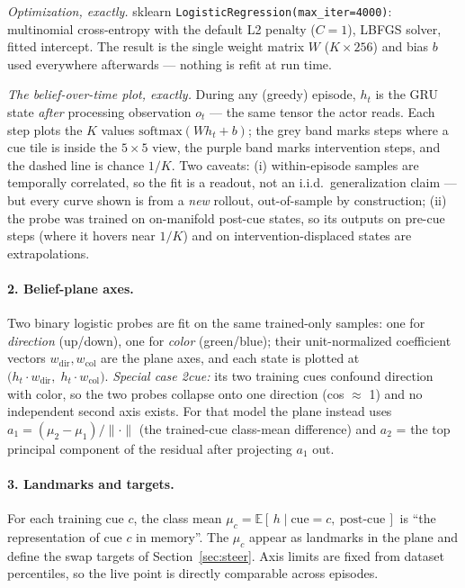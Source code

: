 \documentclass[11pt]{article}
\begin{document}
\emph{Optimization, exactly.} sklearn \texttt{LogisticRegression(max\_iter=4000)}: multinomial
cross-entropy with the default L2 penalty ($C{=}1$), LBFGS solver, fitted intercept. The result
is the single weight matrix $W$ ($K \times 256$) and bias $b$ used everywhere afterwards ---
nothing is refit at run time.

\emph{The belief-over-time plot, exactly.} During any (greedy) episode, $h_t$ is the GRU state
\emph{after} processing observation $o_t$ --- the same tensor the actor reads. Each step plots the
$K$ values $\mathrm{softmax}(W h_t + b)$; the grey band marks steps where a cue tile is inside
the $5\times5$ view, the purple band marks intervention steps, and the dashed line is chance
$1/K$. Two caveats: (i) within-episode samples are temporally correlated, so the fit is a
readout, not an i.i.d.\ generalization claim --- but every curve shown is from a \emph{new}
rollout, out-of-sample by construction; (ii) the probe was trained on on-manifold post-cue
states, so its outputs on pre-cue steps (where it hovers near $1/K$) and on intervention-displaced
states are extrapolations.

\paragraph{2. Belief-plane axes.} Two binary logistic probes are fit on the same trained-only
samples: one for \emph{direction} (up/down), one for \emph{color} (green/blue); their
unit-normalized coefficient vectors $w_{\text{dir}}, w_{\text{col}}$ are the plane axes, and each
state is plotted at $\big(h_t \cdot w_{\text{dir}},\; h_t \cdot w_{\text{col}}\big)$.
\emph{Special case 2cue:} its two training cues confound direction with color, so the two probes
collapse onto one direction (cos $\approx$ 1) and no independent second axis exists. For that
model the plane instead uses $a_1 = (\mu_2 - \mu_1)/\lVert\cdot\rVert$ (the trained-cue
class-mean difference) and $a_2$ = the top principal component of the residual after projecting
$a_1$ out.

\paragraph{3. Landmarks and targets.} For each training cue $c$, the class mean
$\mu_c = \mathbb{E}[\,h \mid \text{cue}=c,\ \text{post-cue}\,]$ is ``the representation of cue
$c$ in memory''. The $\mu_c$ appear as landmarks in the plane and define the swap targets of
Section~\ref{sec:steer}. Axis limits are fixed from dataset percentiles, so the live point is
directly comparable across episodes.
\end{document}
